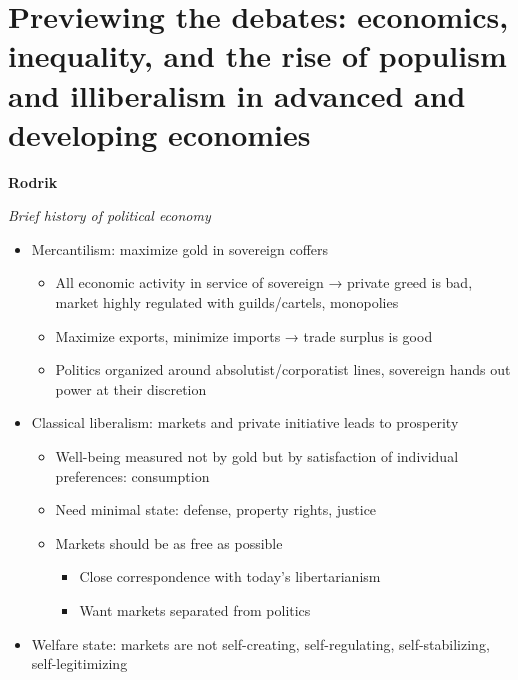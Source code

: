\hypertarget{previewing-the-debates-economics-inequality-and-the-rise-of-populism-and-illiberalism-in-advanced-and-developing-economies}{%
\section{Previewing the debates: economics, inequality, and the rise of
populism and illiberalism in advanced and developing
economies}\label{previewing-the-debates-economics-inequality-and-the-rise-of-populism-and-illiberalism-in-advanced-and-developing-economies}}

\textbf{Rodrik}

\emph{Brief history of political economy}

\begin{itemize}
\tightlist
\item
  Mercantilism: maximize gold in sovereign coffers

  \begin{itemize}
  \tightlist
  \item
    All economic activity in service of sovereign → private greed is
    bad, market highly regulated with guilds/cartels, monopolies
  \item
    Maximize exports, minimize imports → trade surplus is good
  \item
    Politics organized around absolutist/corporatist lines, sovereign
    hands out power at their discretion
  \end{itemize}
\item
  Classical liberalism: markets and private initiative leads to
  prosperity

  \begin{itemize}
  \tightlist
  \item
    Well-being measured not by gold but by satisfaction of individual
    preferences: consumption
  \item
    Need minimal state: defense, property rights, justice
  \item
    Markets should be as free as possible

    \begin{itemize}
    \tightlist
    \item
      Close correspondence with today's libertarianism
    \item
      Want markets separated from politics
    \end{itemize}
  \end{itemize}
\item
  Welfare state: markets are not self-creating, self-regulating,
  self-stabilizing, self-legitimizing


\end{itemize}
